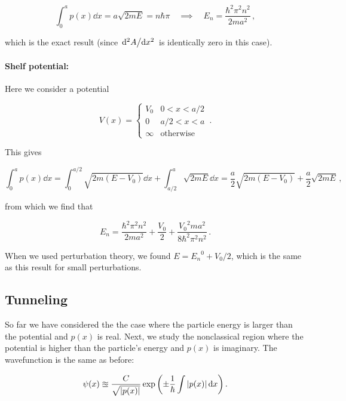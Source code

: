 \documentclass[12pt, titlepage]{article}
\begin{document}
\begin{mdframed}[backgroundcolor=gray!20]
\begin{equation*}
	\int_{0}^{a}p(x)\dd{x} = a\sqrt{2mE} = n\hbar\pi \quad\implies\quad E_n = \frac{\hbar^2\pi^2n^2}{2ma^2} \,,
\end{equation*}

which is the exact result (since $\dv*[2]{A}{x}$ is identically zero in this case).

\paragraph*{Shelf potential:}
Here we consider a potential

\begin{equation*}
	V(x) = \begin{cases}
	V_0 & 0<x<a/2 \\
	0 & a/2<x<a \\
	\infty & \text{otherwise}
	\end{cases} \,.
\end{equation*}

This gives

\begin{equation*}
	\int_{0}^{a}p(x)\dd{x} = \int_{0}^{a/2}\sqrt{2m(E-V_0)}\dd{x} + \int_{a/2}^{a}\sqrt{2mE}\dd{x} = \frac{a}{2}\sqrt{2m(E-V_0)} + \frac{a}{2}\sqrt{2mE} \,,
\end{equation*}

from which we find that 

\begin{equation*}
	E_n = \frac{\hbar^2\pi^2n^2}{2ma^2} + \frac{V_0}{2} + \frac{{V_0}^2ma^2}{8\hbar^2\pi^2n^2} \,.
\end{equation*}

When we used perturbation theory, we found $E = {E_n}^0 + V_0/2$, which is the same as this result for small perturbations.
\end{mdframed}

\subsection{Tunneling}
So far we have considered the the case where the particle energy is larger than the potential and $p(x)$ is real. Next, we study the nonclassical region where the potential is higher than the particle's energy and $p(x)$ is imaginary. The wavefunction is the same as before:

\begin{equation}
	\psi(x) \approxeq \frac{C}{\sqrt{|p(x)|}}\exp\qty(\pm\frac{1}{\hbar}\int |p(x)|\dd{x}) \,.
\end{equation}
\end{document}
